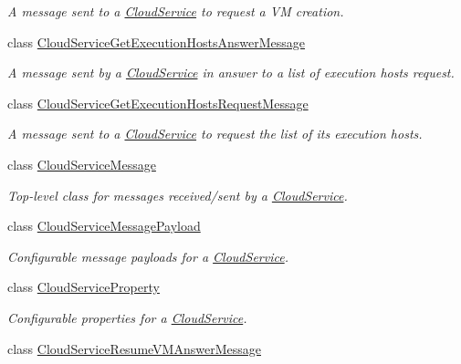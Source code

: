 \begin{DoxyCompactItemize}
\begin{DoxyCompactList}\small\item\em A message sent to a \hyperlink{classwrench_1_1_cloud_service}{Cloud\+Service} to request a VM creation. \end{DoxyCompactList}\item 
class \hyperlink{classwrench_1_1_cloud_service_get_execution_hosts_answer_message}{Cloud\+Service\+Get\+Execution\+Hosts\+Answer\+Message}
\begin{DoxyCompactList}\small\item\em A message sent by a \hyperlink{classwrench_1_1_cloud_service}{Cloud\+Service} in answer to a list of execution hosts request. \end{DoxyCompactList}\item 
class \hyperlink{classwrench_1_1_cloud_service_get_execution_hosts_request_message}{Cloud\+Service\+Get\+Execution\+Hosts\+Request\+Message}
\begin{DoxyCompactList}\small\item\em A message sent to a \hyperlink{classwrench_1_1_cloud_service}{Cloud\+Service} to request the list of its execution hosts. \end{DoxyCompactList}\item 
class \hyperlink{classwrench_1_1_cloud_service_message}{Cloud\+Service\+Message}
\begin{DoxyCompactList}\small\item\em Top-\/level class for messages received/sent by a \hyperlink{classwrench_1_1_cloud_service}{Cloud\+Service}. \end{DoxyCompactList}\item 
class \hyperlink{classwrench_1_1_cloud_service_message_payload}{Cloud\+Service\+Message\+Payload}
\begin{DoxyCompactList}\small\item\em Configurable message payloads for a \hyperlink{classwrench_1_1_cloud_service}{Cloud\+Service}. \end{DoxyCompactList}\item 
class \hyperlink{classwrench_1_1_cloud_service_property}{Cloud\+Service\+Property}
\begin{DoxyCompactList}\small\item\em Configurable properties for a \hyperlink{classwrench_1_1_cloud_service}{Cloud\+Service}. \end{DoxyCompactList}\item 
class \hyperlink{classwrench_1_1_cloud_service_resume_v_m_answer_message}{Cloud\+Service\+Resume\+V\+M\+Answer\+Message}

\end{DoxyCompactItemize}
